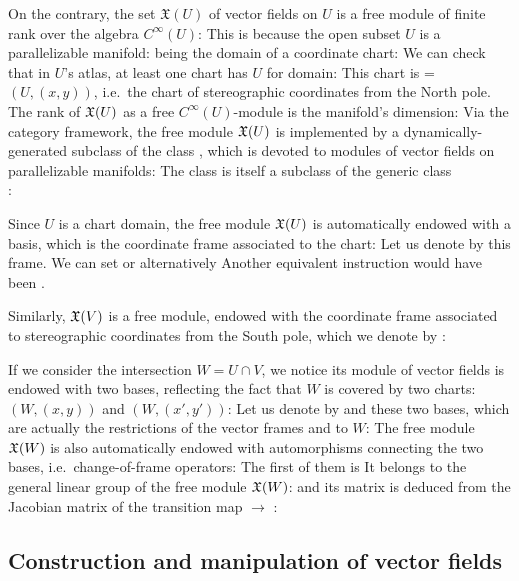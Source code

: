 On the contrary, the set $\mathfrak{X}(U)$ of vector fields on $U$ is a free module of
finite rank over the algebra $C^\infty(U)$:
This is because the open subset $U$ is a parallelizable manifold:
being the domain of a coordinate chart:
We can check that in $U$'s atlas, at least one chart has $U$ for domain:
This chart is  = $(U, (x,y))$, i.e.\ the chart of stereographic coordinates
from the North pole.
The rank of $\mathfrak{X}(U)$ as a free $C^\infty(U)$-module is the manifold's dimension:
Via the category framework,
the free module $\mathfrak{X}(U)$ is implemented by a dynamically-generated subclass
of the class , which is devoted to modules of vector fields
on parallelizable manifolds:
The class  is itself a subclass
of the generic class\\ :

Since $U$ is a chart domain, the free module $\mathfrak{X}(U)$ is automatically endowed with a basis,
which is the coordinate frame associated to the chart:
Let us denote by  this frame. We can set  or
alternatively
Another equivalent instruction would have been .

Similarly, $\mathfrak{X}(V)$ is a free module, endowed with the coordinate frame
associated to stereographic coordinates from the South pole, which we
denote by :

If we consider the intersection $W=U\cap V$, we notice its module
of vector fields is endowed with two bases, reflecting the fact that
$W$ is covered by two charts: $(W,(x,y))$ and $(W,(x',y'))$:
Let us denote by  and  these two bases, which are
actually the restrictions of the vector frames  and  to
$W$:
The free module $\mathfrak{X}(W)$ is also automatically endowed with automorphisms
connecting the two bases, i.e.\ change-of-frame operators:
The first of them is
It belongs to the general linear group of the free module $\mathfrak{X}(W)$:
and its matrix is deduced from the Jacobian matrix of the transition map
 $\to$ :

\subsection{Construction and manipulation of vector fields}

